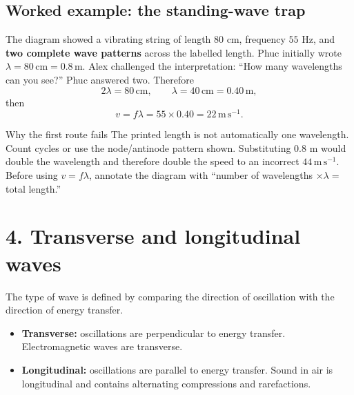 \documentclass[11pt,a4paper]{article}
\newcommand{\unit}[1]{\,\mathrm{#1}}
\begin{document}
\subsection*{Worked example: the standing-wave trap}
The diagram showed a vibrating string of length $80$ cm, frequency $55$ Hz, and \textbf{two complete wave patterns} across the labelled length. Phuc initially wrote $\lambda=80\,\mathrm{cm}=0.8\,\mathrm{m}$. Alex challenged the interpretation: ``How many wavelengths can you see?'' Phuc answered two. Therefore
\[
2\lambda=80\unit{cm},\qquad \lambda=40\unit{cm}=0.40\unit{m},
\]
then
\[
v=f\lambda=55\times0.40=22\unit{m\,s^{-1}}.
\]

\begin{mistakebox}{Why the first route fails}
The printed length is not automatically one wavelength. Count cycles or use the node/antinode pattern shown. Substituting $0.8$ m would double the wavelength and therefore double the speed to an incorrect $44\,\mathrm{m\,s^{-1}}$. Before using $v=f\lambda$, annotate the diagram with ``number of wavelengths $\times\lambda=$ total length.''
\end{mistakebox}

\section*{4. Transverse and longitudinal waves}
The type of wave is defined by comparing the direction of oscillation with the direction of energy transfer.
\begin{itemize}
\item \textbf{Transverse:} oscillations are perpendicular to energy transfer. Electromagnetic waves are transverse.
\item \textbf{Longitudinal:} oscillations are parallel to energy transfer. Sound in air is longitudinal and contains alternating compressions and rarefactions.
\end{itemize}

\begin{center}
\end{center}
\end{document}
